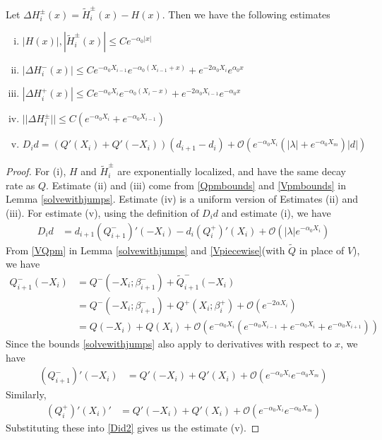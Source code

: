 \documentclass[thesis.tex]{subfiles}
\begin{document}
\begin{lemma}\label{stabestimates}
Let $\Delta H_i^\pm(x) = \tilde{H}_i^\pm(x) - H(x)$. Then we have the following estimates
\begin{enumerate}[(i)]
\item $|H(x)|, |\tilde{H}_i^\pm(x)| \leq C e^{-\alpha_0 |x|}$
\item $|\Delta H_i^-(x)| \leq C e^{-\alpha_0 X_{i-1}} e^{-\alpha_0(X_{i-1} + x) } + e^{-2 \alpha_0 X_i} e^{\alpha_0 x}$
\item $|\Delta H_i^+(x)| \leq C e^{-\alpha_0 X_i} e^{-\alpha_0(X_i - x) } + e^{-2 \alpha_0 X_{i-1}} e^{-\alpha_0 x} $
\item $||\Delta H_i^\pm|| \leq C(e^{-\alpha_0 X_i} + e^{-\alpha_0 X_{i-1}} )$ 
\item $D_i d = ( Q'(X_i) + Q'(-X_i))(d_{i+1} - d_i ) + \mathcal{O} \left( e^{-\alpha_0 X_i} \left( |\lambda| +  e^{-\alpha_0 X_m}  \right) |d| \right)$
\end{enumerate}
\begin{proof}
For (i), $H$ and $\tilde{H}_i^\pm$ are exponentially localized, and have the same decay rate as $Q$. Estimate (ii) and (iii) come from \eqref{Qpmbounds} and \eqref{Vpmbounds} in Lemma \ref{solvewithjumps}. Estimate (iv) is a uniform version of Estimates (ii)  and (iii). For estimate (v), using the definition of $D_i d$ and estimate (i), we have
\begin{align}\label{Did2}
D_i d &= d_{i+1}(Q_{i+1}^-)'(-X_i) - d_i (Q_i^+)'(X_i) + \mathcal{O}(|\lambda| e^{-\alpha_0 X_i}) 
\end{align}
From \eqref{VQpm} in Lemma \ref{solvewithjumps} and \eqref{Vpiecewise}(with $\tilde{Q}$ in place of $V$), we have
\begin{align*}
Q_{i+1}^-(-X_i) &= Q^-(-X_i; \beta_{i+1}^-) + \tilde{Q}_{i+1}^-(-X_i) \\
&= Q^-(-X_i; \beta_{i+1}^-) + Q^+(X_i; \beta_i^+) + \mathcal{O}(e^{-2 \alpha X_i}) \\
&= Q(-X_i) + Q(X_i) 
+ \mathcal{O}(e^{-\alpha_0 X_i}(e^{-\alpha_0 X_{i-1}}+e^{-\alpha_0 X_i}+e^{-\alpha_0 X_{i+1}}))
\end{align*}
Since the bounds \ref{solvewithjumps} also apply to derivatives with respect to $x$, we have
\begin{align*}
(Q_{i+1}^-)'(-X_i) &= Q'(-X_i) + Q'(X_i) + \mathcal{O}(e^{-\alpha_0 X_i}e^{-\alpha_0 X_m})
\end{align*}
Similarly,
\begin{align*}
(Q_i^+)'(X_i)' &= Q'(-X_i) + Q'(X_i) + \mathcal{O}(e^{-\alpha_0 X_i}e^{-\alpha_0 X_m})
\end{align*}
Substituting these into \eqref{Did2} gives us the estimate (v).
\end{proof}
\end{lemma}
\end{document}
